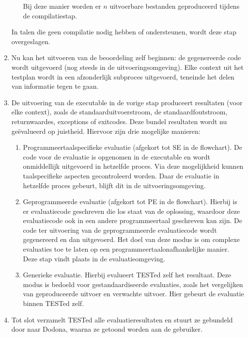 \begin{enumerate}
\begin{enumerate}
        Bij deze manier worden er $n$ uitvoerbare bestanden geproduceerd tijdens de compilatiestap.
    \end{enumerate}
    In talen die geen compilatie nodig hebben of ondersteunen, wordt deze stap overgeslagen.
    \item Nu kan het uitvoeren van de beoordeling zelf beginnen: de gegenereerde code wordt uitgevoerd (nog steeds in de uitvoeringsomgeving).
    Elke context uit het testplan wordt in een afzonderlijk subproces uitgevoerd, teneinde het delen van informatie tegen te gaan.
    \item De uitvoering van de executable in de vorige stap produceert resultaten (voor elke context), zoals de standaarduitvoerstroom, de standaardfoutstroom, returnwaardes, exceptions of exitcodes.
    Deze bundel resultaten wordt nu geëvalueerd op juistheid.
    Hiervoor zijn drie mogelijke manieren:
    \begin{enumerate}
        \item Programmeertaalspecifieke evaluatie (afgekort tot SE in de flowchart).
        De code voor de evaluatie is opgenomen in de executable en wordt onmiddellijk uitgevoerd in hetzelfde proces.
        Via deze mogelijkheid kunnen taalspecifieke aspecten gecontroleerd worden.
        Daar de evaluatie in hetzelfde proces gebeurt, blijft dit in de uitvoeringsomgeving.
        \item Geprogrammeerde evaluatie (afgekort tot PE in de flowchart).
        Hierbij is er evaluatiecode geschreven die los staat van de oplossing, waardoor deze evaluatiecode ook in een andere programmeertaal geschreven kan zijn.
        De code ter uitvoering van de geprogrammeerde evaluatiecode wordt gegenereerd en dan uitgevoerd.
        Het doel van deze modus is om complexe evaluaties toe te laten op een programmeertaalonafhankelijke manier.
        Deze stap vindt plaats in de evaluatieomgeving.
        \item Generieke evaluatie.
        Hierbij evalueert TESTed zelf het resultaat.
        Deze modus is bedoeld voor gestandaardiseerde evaluaties, zoals het vergelijken van geproduceerde uitvoer en verwachte uitvoer.
        Hier gebeurt de evaluatie binnen TESTed zelf.
    \end{enumerate}
    \item Tot slot verzamelt TESTed alle evaluatieresultaten en stuurt ze gebundeld door naar Dodona, waarna ze getoond worden aan de gebruiker.
\end{enumerate}

